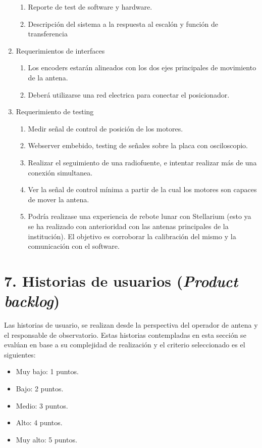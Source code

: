 \documentclass[11pt, %
codirector, %
]{charter}
\begin{document}
\begin{enumerate}
\begin{enumerate}
			\item Reporte de test de software y hardware. 
			\item Descripción del sistema a la respuesta al escalón y función de transferencia
	\end{enumerate}
	\item Requerimientos de interfaces
		\begin{enumerate}
			\item Los encoders estarán alineados con los dos ejes principales de movimiento de la antena. 
			\item Deberá utilizarse una red electrica para conectar el posicionador.
		\end{enumerate}
	\item Requerimiento de testing
		\begin{enumerate}
			\item Medir señal de control de posición de los motores.
			\item Webserver embebido, testing de señales sobre la placa con osciloscopio.
			\item Realizar el seguimiento de una radiofuente, e intentar realizar más de una conexión simultanea. 
			\item Ver la señal de control mínima a partir de la cual los motores son capaces de mover la antena. 
			\item Podría realizase una experiencia de rebote lunar con Stellarium (esto ya se ha realizado con anterioridad con las antenas principales de la institución). El objetivo es corroborar la calibración del mismo y la comunicación con el software.  

		\end{enumerate}
\end{enumerate}

\section{7. Historias de usuarios (\textit{Product backlog})}
\label{sec:backlog}

Las historias de usuario, se realizan desde la perspectiva del operador de antena y el responsable de observatorio. Estas historias contempladas en esta sección se evalúan en base a su complejidad de realización y el criterio seleccionado es el siguientes: 
\begin{itemize}
	\item Muy bajo: 1 puntos. 
	\item Bajo: 2 puntos.
	\item Medio: 3 puntos. 
	\item Alto: 4 puntos. 
	\item Muy alto: 5 puntos.
\end{itemize}
\end{document}
